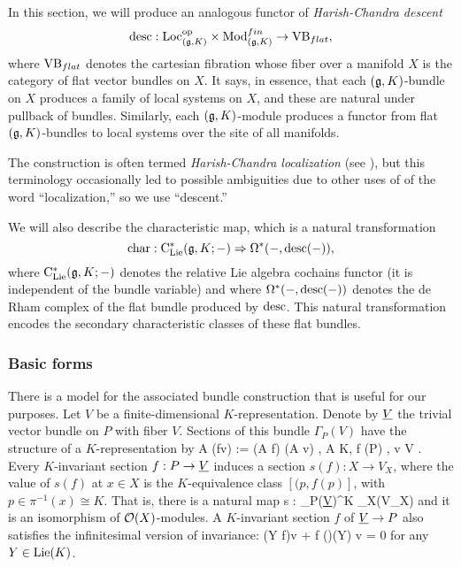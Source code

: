 In this section, we will produce an analogous functor of {\em Harish-Chandra descent}
\[
{\rm desc}: {\rm Loc}_{(\mathfrak g,K)}^{{\rm op}} \times {\rm Mod}_{(\mathfrak g,K)}^{fin} \to {\rm VB}_{flat},
\]
where ${\rm VB}_{flat}$ denotes the cartesian fibration whose fiber over a manifold $X$ is the category of flat vector bundles on $X$.
It says, in essence, that each $(\mathfrak g,K)$-bundle on $X$ produces a family of local systems on $X$, and 
these are natural under pullback of bundles.
Similarly, each $(\mathfrak g,K)$-module produces a functor from flat $(\mathfrak g,K)$-bundles to local systems over the site of all manifolds.

\begin{rmk}
The construction is often termed \emph{Harish-Chandra localization}
(see \cite{BK} \cite{BL}),
but this terminology occasionally led to possible ambiguities due to other uses of of the word ``localization,''
so we use ``descent.''
\end{rmk}

We will also describe the characteristic map, which is a natural transformation 
\[
{\rm char} : {\rm C}_{{\rm Lie}}^*(\mathfrak g,K; -) \Rightarrow \Omega^*(-,{\rm desc}(-)),
\]
where ${\rm C}_{{\rm Lie}}^*(\mathfrak g,K; -)$ denotes the relative Lie algebra cochains functor (it is independent of the bundle variable) and 
where $\Omega^*(-,{\rm desc}(-))$ denotes the de Rham complex of the flat bundle produced by ${\rm desc}$.
This natural transformation encodes the secondary characteristic classes of these flat bundles.

\subsubsection{Basic forms}

There is a model for the associated bundle construction that is useful for our purposes. 
Let $V$ be a finite-dimensional $K$-representation. 
Denote by $\underline{V}$ the trivial vector bundle on $P$ with fiber $V$. 
Sections of this bundle $\Gamma_P(V)$ have the structure of a $K$-representation by
\ben
A \cdot (f\tensor v) := (A \cdot f) \tensor (A \cdot v) \;\; , \;\; A \in K, \; f \in \cO(P)\; , v \in V .
\een
Every $K$-invariant section $f : P \to \underline{V}$ induces a section $s(f): X \to V_X$,
where the value of $s(f)$ at $x \in X$ is the $K$-equivalence class $[(p,f(p)]$, with $p \in \pi^{-1}(x) \cong K$.
That is, there is a natural map 
\ben
s : \Gamma_P(\ul{V})^K \to \Gamma_X(V_X) 
\een
and it is an isomorphism of $\mathcal O(X)$-modules. A $K$-invariant section $f$ of $\underline{V} \to P$ also satisfies the infinitesimal version of invariance: 
\ben
(Y \cdot f)\tensor v + f (\rho)(Y) \cdot v = 0 
\een
for any $Y \in {\rm Lie}(K)$.

